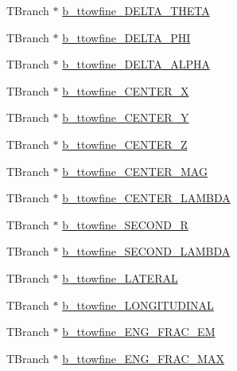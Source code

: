 \begin{DoxyCompactItemize}
\item 
T\+Branch $\ast$ \hyperlink{classCollectionTree_aeba81cf2c76e6a23bb395e8eaacb9c90}{b\+\_\+ttowfine\+\_\+\+D\+E\+L\+T\+A\+\_\+\+T\+H\+E\+TA}
\item 
T\+Branch $\ast$ \hyperlink{classCollectionTree_ab9ccdf71528716ec90e2a10fddf525bb}{b\+\_\+ttowfine\+\_\+\+D\+E\+L\+T\+A\+\_\+\+P\+HI}
\item 
T\+Branch $\ast$ \hyperlink{classCollectionTree_a6587ec27cfa2177b53d3e66a6e3e331e}{b\+\_\+ttowfine\+\_\+\+D\+E\+L\+T\+A\+\_\+\+A\+L\+P\+HA}
\item 
T\+Branch $\ast$ \hyperlink{classCollectionTree_a1c2ae8ad3207732e0373732f25e5bcb5}{b\+\_\+ttowfine\+\_\+\+C\+E\+N\+T\+E\+R\+\_\+X}
\item 
T\+Branch $\ast$ \hyperlink{classCollectionTree_a04b122fe6dec5aea66641e515ec1a1e4}{b\+\_\+ttowfine\+\_\+\+C\+E\+N\+T\+E\+R\+\_\+Y}
\item 
T\+Branch $\ast$ \hyperlink{classCollectionTree_a573b8bfe8e60fdd175b3c361805b1218}{b\+\_\+ttowfine\+\_\+\+C\+E\+N\+T\+E\+R\+\_\+Z}
\item 
T\+Branch $\ast$ \hyperlink{classCollectionTree_a19d63116455b5d9d4339fb2006aeb3aa}{b\+\_\+ttowfine\+\_\+\+C\+E\+N\+T\+E\+R\+\_\+\+M\+AG}
\item 
T\+Branch $\ast$ \hyperlink{classCollectionTree_a6874b4a1cfa380a1d4b0309894e07a11}{b\+\_\+ttowfine\+\_\+\+C\+E\+N\+T\+E\+R\+\_\+\+L\+A\+M\+B\+DA}
\item 
T\+Branch $\ast$ \hyperlink{classCollectionTree_a15a241926fcda7874d7ab01041bbe5e5}{b\+\_\+ttowfine\+\_\+\+S\+E\+C\+O\+N\+D\+\_\+R}
\item 
T\+Branch $\ast$ \hyperlink{classCollectionTree_add30b6902bbaa74fb99d54cb1c1d8c33}{b\+\_\+ttowfine\+\_\+\+S\+E\+C\+O\+N\+D\+\_\+\+L\+A\+M\+B\+DA}
\item 
T\+Branch $\ast$ \hyperlink{classCollectionTree_aa04e6112aa7628c6af1c4ac0adcbcc95}{b\+\_\+ttowfine\+\_\+\+L\+A\+T\+E\+R\+AL}
\item 
T\+Branch $\ast$ \hyperlink{classCollectionTree_a85ba7e9b1d0f414728f58b6155b4c5e9}{b\+\_\+ttowfine\+\_\+\+L\+O\+N\+G\+I\+T\+U\+D\+I\+N\+AL}
\item 
T\+Branch $\ast$ \hyperlink{classCollectionTree_a5b3c0b469aaff04e0a24f5b5c521a949}{b\+\_\+ttowfine\+\_\+\+E\+N\+G\+\_\+\+F\+R\+A\+C\+\_\+\+EM}
\item 
T\+Branch $\ast$ \hyperlink{classCollectionTree_a06b98b436457d14c1f430334512f67c5}{b\+\_\+ttowfine\+\_\+\+E\+N\+G\+\_\+\+F\+R\+A\+C\+\_\+\+M\+AX}
\item 

\end{DoxyCompactItemize}
